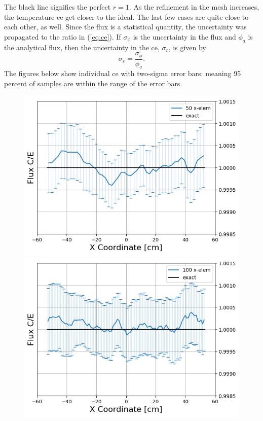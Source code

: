 \documentclass[letterpaper]{mc2023}
\begin{document}
The black line signifies the perfect $r=1$. As the refinement in the mesh increases, the temperature \gls{ce} get closer to the ideal. The last few
cases are quite close to each other, as well. Since the flux is a statistical quantity, the uncertainty was propagated to the ratio in (\ref{eq:ce}).
If $\sigma_{\phi}$ is the uncertainty in the flux and  $\phi_{a}$ is the analytical flux, then the uncertainty in the \gls{ce}, $\sigma_{r}$, is
given by
\begin{equation}\label{eq:err_prop_r}
    \sigma_{r} = \frac{\sigma_{\phi}}{\phi_{a}}.
\end{equation}
The figures below show individual \gls{ce} with two-sigma error bars: meaning 95 percent of samples are within the range of the error bars.
\begin{figure}[H]
    \centering
    \begin{minipage}[b]{0.32\linewidth}
        \includegraphics[width=\linewidth]{figures/50_flux_CE_error_bars.png}
    \end{minipage}
    \begin{minipage}[b]{0.32\linewidth}
        \includegraphics[width=\linewidth]{figures/100_flux_CE_error_bars.png}

\end{minipage}
\end{figure}
\end{document}
